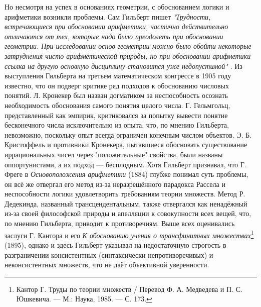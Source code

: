 \documentclass[14pt]{extarticle}
\begin{document}
	Но несмотря на успех в основаниях геометрии, с обоснованием логики и арифметики возникли проблемы. Сам Гильберт пишет \textit{"Трудности, встречающиеся при обосновании арифметики, частично действительно отличаются от тех, которые надо было преодолеть при обосновании геометрии. При исследовании основ геометрии можно было обойти некоторые затруднения чисто арифметической природы; но при обосновании арифметики ссылка на другую основную дисциплину становится уже недопустимой"} \cite[399]{Gilbert_izbrannoe}. 
	Из выступления Гильберта на третьем математическом конгрессе в 1905 году \cite{Gilbert1924} известно, что он подверг критике ряд подходов к обоснованию числовых понятий. Л. Кронекер был назван догматиком за неспособность осознать необходимость обоснования самого понятия целого числа. Г. Гельмгольц, представленный как эмпирик, критиковался за попытку вывести понятие бесконечного числа исключительно из опыта, что, по мнению Гильберта, невозможно, поскольку опыт всегда ограничен конечным числом объектов. Э. Б. Кристоффель и противники Кронекера, пытавшиеся обосновать существование иррациональных чисел через "положительные" свойства, были названы оппортунистами, а их подход — бесплодным. Хотя Гильберт признавал, что Г. Фреге в \textit{Основоположения арифметики} (1884) глубже понимал суть проблемы, он всё же отвергал его метод из-за неразрешённого парадокса Рассела и неспособности логики удовлетворить требованиям теории множеств. Метод Р. Дедекинда, названный трансцендентальным, также отвергался как ненадёжный из-за своей философской природы и апелляции к совокупности всех вещей, что, по мнению Гильберта, приводит к противоречиям. Выше всех оценивались заслуги Г. Кантора и его \textit{К обоснованию учения о трансфинитных множествах}\footnote{Кантор Г. Труды по теории множеств / Перевод Ф. А. Медведева и П. С. Юшкевича. — М.: Наука, 1985. — С. 173.} (1895), однако и здесь Гильберт указывал на недостаточную строгость в разграничении консистентных  (синтаксически непротиворечивых) и неконсистентных множеств, что не даёт объективной уверенности.
	
\end{document}
